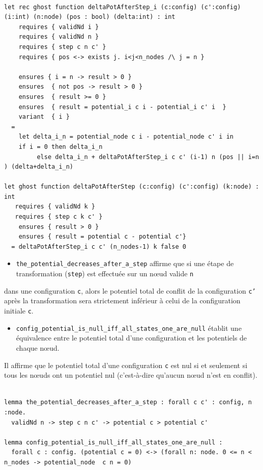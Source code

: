 \documentclass[11pt]{article}
\begin{document}
\lstset{language=why3,label= ,caption= ,captionpos=b,numbers=none}
\begin{lstlisting}

let rec ghost function deltaPotAfterStep_i (c:config) (c':config) (i:int) (n:node) (pos : bool) (delta:int) : int
    requires { validNd i }
    requires { validNd n }
    requires { step c n c' }
    requires { pos <-> exists j. i<j<n_nodes /\ j = n }

    ensures { i = n -> result > 0 }
    ensures  { not pos -> result > 0 }
    ensures  { result >= 0 }
    ensures  { result = potential_i c i - potential_i c' i  }
    variant  { i }
  =
    let delta_i_n = potential_node c i - potential_node c' i in
    if i = 0 then delta_i_n
	     else delta_i_n + deltaPotAfterStep_i c c' (i-1) n (pos || i=n ) (delta+delta_i_n)

let ghost function deltaPotAfterStep (c:config) (c':config) (k:node) : int
   requires { validNd k }
   requires { step c k c' }
    ensures { result > 0 }
    ensures { result = potential c - potential c'}
  = deltaPotAfterStep_i c c' (n_nodes-1) k false 0

\end{lstlisting}


\begin{itemize}
\item \texttt{the\_potential\_decreases\_after\_a\_step} affirme que si une étape de transformation (\texttt{step}) est effectuée sur un nœud valide \texttt{n}
\end{itemize}
dans une configuration \texttt{c}, alors le potentiel total de conflit de la configuration \texttt{c'} après la transformation sera strictement inférieur à celui de la configuration initiale \texttt{c}.

\begin{itemize}
\item \texttt{config\_potential\_is\_null\_iff\_all\_states\_one\_are\_null} établit une équivalence entre le potentiel total d'une configuration et les potentiels de chaque nœud.
\end{itemize}
Il affirme que le potentiel total d'une configuration \texttt{c} est nul si et seulement si tous les nœuds ont un potentiel nul (c'est-à-dire qu'aucun nœud n'est en conflit).


\lstset{language=why3,label= ,caption= ,captionpos=b,numbers=none}
\begin{lstlisting}

lemma the_potential_decreases_after_a_step : forall c c' : config, n :node.
  validNd n -> step c n c' -> potential c > potential c'

lemma config_potential_is_null_iff_all_states_one_are_null :
  forall c : config. (potential c = 0) <-> (forall n: node. 0 <= n < n_nodes -> potential_node  c n = 0)

\end{lstlisting}
\end{document}

